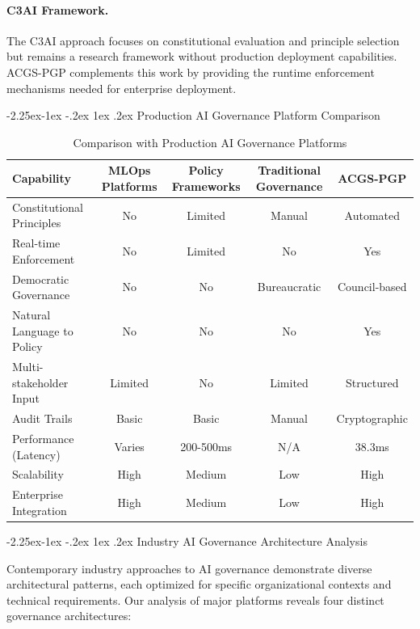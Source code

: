 \documentclass[manuscript,screen,9pt]{acmart}
\makeatletter
\renewcommand\subsection{\@startsection{subsection}{2}{\z@}%
  {-2.25ex\@plus -1ex \@minus -.2ex}%
  {1ex \@plus .2ex}%
  {\normalfont\large\bfseries}}
\newcommand{\tablesize}{\footnotesize}
\makeatother
\begin{document}
\paragraph{C3AI Framework.} The C3AI approach \citep{C3AI2025Framework} focuses on constitutional evaluation and principle selection but remains a research framework without production deployment capabilities. ACGS-PGP complements this work by providing the runtime enforcement mechanisms needed for enterprise deployment.

\subsection{Production AI Governance Platform Comparison}

\begin{table}[ht]
\centering
\caption{Comparison with Production AI Governance Platforms}
\label{tab:production_comparison}
\tablesize
\begin{tabular}{@{}lcccc@{}}
\toprule
\textbf{Capability} & \textbf{MLOps Platforms} & \textbf{Policy Frameworks} & \textbf{Traditional Governance} & \textbf{ACGS-PGP} \\
\midrule
Constitutional Principles & No & Limited & Manual & Automated \\
Real-time Enforcement & No & Limited & No & Yes \\
Democratic Governance & No & No & Bureaucratic & Council-based \\
Natural Language to Policy & No & No & No & Yes \\
Multi-stakeholder Input & Limited & No & Limited & Structured \\
Audit Trails & Basic & Basic & Manual & Cryptographic \\
Performance (Latency) & Varies & 200-500ms & N/A & 38.3ms \\
Scalability & High & Medium & Low & High \\
Enterprise Integration & High & Medium & Low & High \\
\bottomrule
\end{tabular}
\end{table}

\subsection{Industry AI Governance Architecture Analysis}
\label{subsec:industry_architecture_analysis}

Contemporary industry approaches to AI governance demonstrate diverse architectural patterns, each optimized for specific organizational contexts and technical requirements. Our analysis of major platforms reveals four distinct governance architectures:
\end{document}
